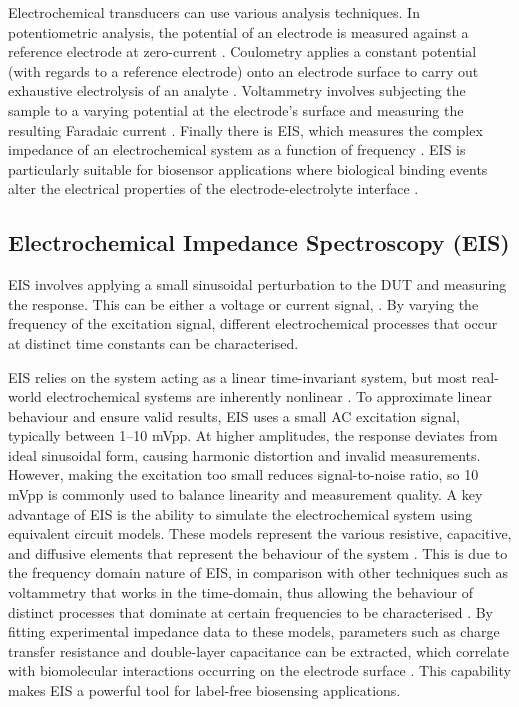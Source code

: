 Electrochemical transducers can use various analysis techniques. In potentiometric analysis, the potential of an electrode is measured against a reference electrode at zero-current \cite{magarElectrochemicalImpedanceSpectroscopy2021}. Coulometry applies a constant potential (with regards to a reference electrode) onto an electrode surface to carry out exhaustive electrolysis of an analyte \cite{magarElectrochemicalImpedanceSpectroscopy2021}. Voltammetry involves subjecting the sample to a varying potential at the electrode's surface and measuring the resulting Faradaic current \cite{magarElectrochemicalImpedanceSpectroscopy2021}. Finally there is \ac{EIS}, which measures the complex impedance of an electrochemical system as a function of frequency \cite{magarElectrochemicalImpedanceSpectroscopy2021}. EIS is particularly suitable for biosensor applications where biological binding events alter the electrical properties of the electrode-electrolyte interface \cite{danielsLabelFreeImpedanceBiosensors2007}. 

\subsection{Electrochemical Impedance Spectroscopy (EIS)}
EIS involves applying a small sinusoidal perturbation to the \ac{DUT} and measuring the response. This can be either a voltage or current signal, . By varying the frequency of the excitation signal, different electrochemical processes that occur at distinct time constants can be characterised.

\Ac{EIS} relies on the system acting as a linear time-invariant system, but most real-world electrochemical systems are inherently nonlinear \cite{lazanasErratumElectrochemicalImpedance2025}. To approximate linear behaviour and ensure valid results, EIS uses a small AC excitation signal, typically between 1–10 mVpp\cite{EISQualityIndicators}\cite{lazanasErratumElectrochemicalImpedance2025}. At higher amplitudes, the response deviates from ideal sinusoidal form, causing harmonic distortion and invalid measurements. However, making the excitation too small reduces signal-to-noise ratio, so 10 mVpp is commonly used to balance linearity and measurement quality.  
A key advantage of \ac{EIS} is the ability to simulate the electrochemical system using equivalent circuit models. These models represent the various resistive, capacitive, and diffusive elements that represent the behaviour of the system \cite{lazanasErratumElectrochemicalImpedance2025}. This is due to the frequency domain nature of EIS, in comparison with other techniques such as voltammetry that works in the time-domain, thus allowing the behaviour of distinct processes that dominate at certain frequencies to be characterised \cite{lazanasErratumElectrochemicalImpedance2025}. By fitting experimental impedance data to these models, parameters such as charge transfer resistance and double-layer capacitance can be extracted, which correlate with biomolecular interactions occurring on the electrode surface \cite{danielsLabelFreeImpedanceBiosensors2007}. This capability makes \ac{EIS} a powerful tool for label-free biosensing applications. 

